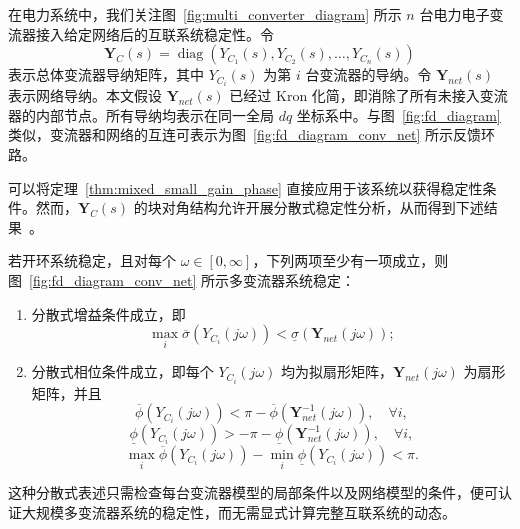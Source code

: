 在电力系统中，我们关注图~\ref{fig:multi_converter_diagram} 所示 $n$ 台电力电子变流器接入给定网络后的互联系统稳定性。令
\begin{equation}
\mathbf{Y}_C(s)=\operatorname{diag}(Y_{C_1}(s),Y_{C_2}(s),\ldots,Y_{C_n}(s))
\label{eq:block_diagonal}
\end{equation}
表示总体变流器导纳矩阵，其中 $Y_{C_i}(s)$ 为第 $i$ 台变流器的导纳。令 $\mathbf{Y}_{net}(s)$ 表示网络导纳。本文假设 $\mathbf{Y}_{net}(s)$ 已经过 Kron 化简，即消除了所有未接入变流器的内部节点。所有导纳均表示在同一全局 $dq$ 坐标系中。与图~\ref{fig:fd_diagram} 类似，变流器和网络的互连可表示为图~\ref{fig:fd_diagram_conv_net} 所示反馈环路。

可以将定理~\ref{thm:mixed_small_gain_phase} 直接应用于该系统以获得稳定性条件。然而，$\mathbf{Y}_C(s)$ 的块对角结构允许开展分散式稳定性分析，从而得到下述结果~\cite{huangGainPhaseDecentralized2024}。

\begin{thm}
若开环系统稳定，且对每个 $\omega\in[0,\infty]$，下列两项至少有一项成立，则图~\ref{fig:fd_diagram_conv_net} 所示多变流器系统稳定：
\begin{enumerate}
\item 分散式增益条件成立，即
\begin{equation*}
\max_i\overline{\sigma}(Y_{C_i}(j\omega))
<\underline{\sigma}(\mathbf{Y}_{net}(j\omega));
\end{equation*}
\item 分散式相位条件成立，即每个 $Y_{C_i}(j\omega)$ 均为拟扇形矩阵，$\mathbf{Y}_{net}(j\omega)$ 为扇形矩阵，并且
\begin{equation*}
\overline{\phi}(Y_{C_i}(j\omega))
<\pi-\overline{\phi}(\mathbf{Y}_{net}^{-1}(j\omega)),\quad\forall i,
\end{equation*}
\begin{equation*}
\underline{\phi}(Y_{C_i}(j\omega))
>-\pi-\underline{\phi}(\mathbf{Y}_{net}^{-1}(j\omega)),\quad\forall i,
\end{equation*}
\begin{equation*}
\max_i\overline{\phi}(Y_{C_i}(j\omega))
-\min_i\underline{\phi}(Y_{C_i}(j\omega))<\pi.
\end{equation*}
\end{enumerate}
\label{thm:dec_mixed_small_gain_phase}
\end{thm}

这种分散式表述只需检查每台变流器模型的局部条件以及网络模型的条件，便可认证大规模多变流器系统的稳定性，而无需显式计算完整互联系统的动态。
